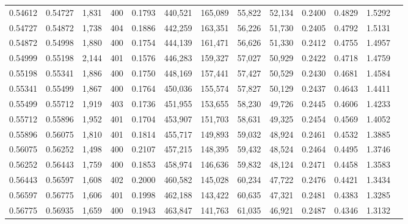 \begin{tabular}{rrrrrrrrrrrrr}
0.54612 & 0.54727 & 1,831 & 400 &                                     0.1793 & 440,521 & 165,089 &  55,822 &  52,134 & 0.2400 & 0.4829 & 1.5292 \\
0.54727 & 0.54872 & 1,738 & 404 &                                     0.1886 & 442,259 & 163,351 &  56,226 &  51,730 & 0.2405 & 0.4792 & 1.5131 \\
0.54872 & 0.54998 & 1,880 & 400 &                                     0.1754 & 444,139 & 161,471 &  56,626 &  51,330 & 0.2412 & 0.4755 & 1.4957 \\
0.54999 & 0.55198 & 2,144 & 401 &                                     0.1576 & 446,283 & 159,327 &  57,027 &  50,929 & 0.2422 & 0.4718 & 1.4759 \\
0.55198 & 0.55341 & 1,886 & 400 &                                     0.1750 & 448,169 & 157,441 &  57,427 &  50,529 & 0.2430 & 0.4681 & 1.4584 \\
0.55341 & 0.55499 & 1,867 & 400 &                                     0.1764 & 450,036 & 155,574 &  57,827 &  50,129 & 0.2437 & 0.4643 & 1.4411 \\
0.55499 & 0.55712 & 1,919 & 403 &                                     0.1736 & 451,955 & 153,655 &  58,230 &  49,726 & 0.2445 & 0.4606 & 1.4233 \\
0.55712 & 0.55896 & 1,952 & 401 &                                     0.1704 & 453,907 & 151,703 &  58,631 &  49,325 & 0.2454 & 0.4569 & 1.4052 \\
0.55896 & 0.56075 & 1,810 & 401 &                                     0.1814 & 455,717 & 149,893 &  59,032 &  48,924 & 0.2461 & 0.4532 & 1.3885 \\
0.56075 & 0.56252 & 1,498 & 400 &                                     0.2107 & 457,215 & 148,395 &  59,432 &  48,524 & 0.2464 & 0.4495 & 1.3746 \\
0.56252 & 0.56443 & 1,759 & 400 &                                     0.1853 & 458,974 & 146,636 &  59,832 &  48,124 & 0.2471 & 0.4458 & 1.3583 \\
0.56443 & 0.56597 & 1,608 & 402 &                                     0.2000 & 460,582 & 145,028 &  60,234 &  47,722 & 0.2476 & 0.4421 & 1.3434 \\
0.56597 & 0.56775 & 1,606 & 401 &                                     0.1998 & 462,188 & 143,422 &  60,635 &  47,321 & 0.2481 & 0.4383 & 1.3285 \\
0.56775 & 0.56935 & 1,659 & 400 &                                     0.1943 & 463,847 & 141,763 &  61,035 &  46,921 & 0.2487 & 0.4346 & 1.3132 \\

\end{tabular}

